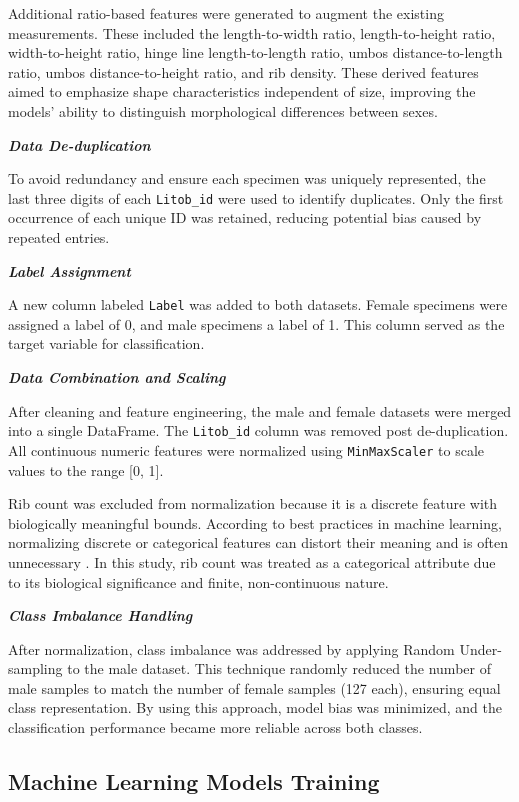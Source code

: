 Additional ratio-based features were generated to augment the existing measurements. These included the length-to-width ratio, length-to-height ratio, width-to-height ratio, hinge line length-to-length ratio, umbos distance-to-length ratio, umbos distance-to-height ratio, and rib density. These derived features aimed to emphasize shape characteristics independent of size, improving the models' ability to distinguish morphological differences between sexes.

\textbf{\textit{Data De-duplication}}

To avoid redundancy and ensure each specimen was uniquely represented, the last three digits of each \texttt{Litob\_id} were used to identify duplicates. Only the first occurrence of each unique ID was retained, reducing potential bias caused by repeated entries.

\newpage
\textbf{\textit{Label Assignment}}

A new column labeled \texttt{Label} was added to both datasets. Female specimens were assigned a label of 0, and male specimens a label of 1. This column served as the target variable for classification.

\textbf{\textit{Data Combination and Scaling}}

After cleaning and feature engineering, the male and female datasets were merged into a single DataFrame. The \texttt{Litob\_id} column was removed post de-duplication. All continuous numeric features were normalized using \texttt{MinMaxScaler} to scale values to the range [0, 1].

Rib count was excluded from normalization because it is a discrete feature with biologically meaningful bounds. According to best practices in machine learning, normalizing discrete or categorical features can distort their meaning and is often unnecessary \cite{jaiswal2024}. In this study, rib count was treated as a categorical attribute due to its biological significance and finite, non-continuous nature.

\textbf{\textit{Class Imbalance Handling}}

After normalization, class imbalance was addressed by applying Random Under-sampling to the male dataset. This technique randomly reduced the number of male samples to match the number of female samples (127 each), ensuring equal class representation. By using this approach, model bias was minimized, and the classification performance became more reliable across both classes.

\subsection{Machine Learning Models Training}

